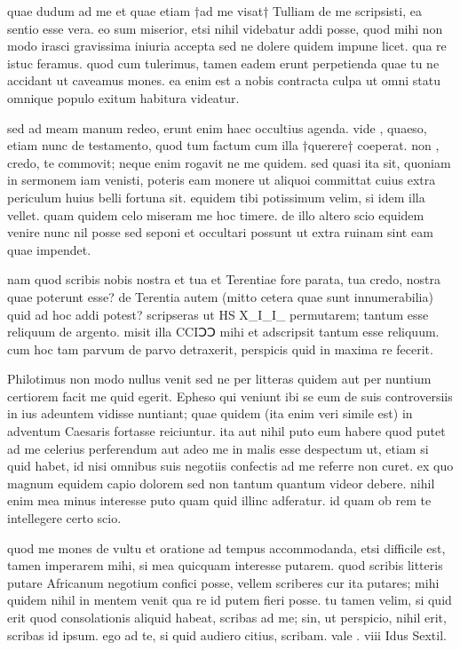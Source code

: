 


 quae dudum ad me et quae etiam †ad me visat† Tulliam de me scripsisti, ea sentio esse vera. eo sum miserior, etsi nihil videbatur addi posse, quod mihi non modo irasci gravissima iniuria accepta sed ne dolere quidem impune licet. qua re istuc feramus. quod cum tulerimus, tamen eadem erunt perpetienda quae tu ne accidant ut caveamus mones. ea enim est a nobis contracta culpa ut omni statu omnique populo exitum habitura videatur.

 sed ad meam manum redeo, erunt enim haec occultius agenda. vide , quaeso, etiam nunc de testamento, quod tum factum cum illa †querere† coeperat. non , credo, te commovit; neque enim rogavit ne me quidem. sed quasi ita sit, quoniam in sermonem iam venisti, poteris eam monere ut aliquoi committat cuius extra periculum huius belli fortuna sit. equidem tibi potissimum velim, si idem illa vellet. quam quidem celo miseram me hoc timere. de illo altero scio equidem venire nunc nil posse sed seponi et occultari possunt ut extra ruinam sint eam quae impendet.

 nam quod scribis nobis nostra et tua et Terentiae fore parata, tua credo, nostra quae poterunt esse? de Terentia autem (mitto cetera quae sunt innumerabilia) quid ad hoc addi potest? scripseras ut HS X_I_I_ permutarem; tantum esse reliquum de argento. misit illa CCIↃↃ mihi et adscripsit tantum esse reliquum. cum hoc tam parvum de parvo detraxerit, perspicis quid in maxima re fecerit.

 Philotimus non modo nullus venit sed ne per litteras quidem aut per nuntium certiorem facit me quid egerit. Epheso qui veniunt ibi se eum de suis controversiis in ius adeuntem vidisse nuntiant; quae quidem (ita enim veri simile est) in adventum Caesaris fortasse reiciuntur. ita aut nihil puto eum habere quod putet ad me celerius perferendum aut adeo me in malis esse despectum ut, etiam si quid habet, id nisi omnibus suis negotiis confectis ad me referre non curet. ex quo magnum equidem capio dolorem sed non tantum quantum videor debere. nihil enim mea minus interesse puto quam quid illinc adferatur. id quam ob rem te intellegere certo scio.

 quod me mones de vultu et oratione ad tempus accommodanda, etsi difficile est, tamen imperarem mihi, si mea quicquam interesse putarem. quod scribis litteris putare Africanum negotium confici posse, vellem scriberes cur ita putares; mihi quidem nihil in mentem venit qua re id putem fieri posse. tu tamen velim, si quid erit quod consolationis aliquid habeat, scribas ad me; sin, ut perspicio, nihil erit, scribas id ipsum. ego ad te, si quid audiero citius, scribam. vale . viii Idus Sextil.
